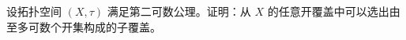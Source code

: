 \begin{exercise}
设拓扑空间 $(X,\tau)$ 满足第二可数公理。证明：从 $X$ 的任意开覆盖中可以选出由至多可数个开集构成的子覆盖。
\end{exercise}






































































